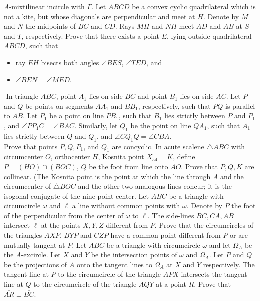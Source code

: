 \documentclass{seto}
\begin{document}
$A$-mixtilinear incircle with $\Gamma$.
 Let $ABCD$ be a convex cyclic quadrilateral which is not a kite, but whose diagonals are perpendicular and meet at $H$. Denote by $M$ and $N$ the midpoints of $\overline{BC}$ and $\overline{CD}$. Rays $MH$ and $NH$ meet $\overline{AD}$ and $\overline{AB}$ at $S$ and $T$, respectively. Prove that there exists a point $E$, lying outside quadrilateral $ABCD$, such that
\begin{itemize}
  \item ray $EH$ bisects both angles $\angle BES$, $\angle TED$, and
  \item $\angle BEN = \angle MED$.
\end{itemize}$ $\vspace{-.8cm}
\exercise[IMO 2019/2] In triangle $ABC$, point $A_1$ lies on side $BC$ and point $B_1$ lies on side $AC$. Let $P$ and $Q$ be points on segments $AA_1$ and $BB_1$, respectively, such that $PQ$ is parallel to $AB$. Let $P_1$ be a point on line $PB_1$, such that $B_1$ lies strictly between $P$ and $P_1$, and $\angle PP_1C=\angle BAC$. Similarly, let $Q_1$ be the point on line $QA_1$, such that $A_1$ lies strictly between $Q$ and $Q_1$, and $\angle CQ_1Q=\angle CBA$. \\[4pt]
Prove that points $P,Q,P_1$, and $Q_1$ are concyclic. 
\exercise[MOP HW \#21] In acute scalene $\triangle ABC$ with circumcenter $O$, orthocenter $H$, Kosnita point $X_{54}=K$, define $P=(HO)\cap(BOC)$, $Q$ be the foot from line onto $AO$. Prove that $P,Q,K$ are collinear. (The Kosnita point is the point at which the line through $A$ and the circumcenter of $\triangle BOC$ and the other two analogous lines concur; it is the isogonal conjugate of the nine-point center. 
\exercise[Shortlist 2012/G8]Let $ABC$ be a triangle with circumcircle $\omega$ and $\ell$ a line without common points with $\omega$. Denote by $P$ the foot of the perpendicular from the center of $\omega$ to $\ell$. The side-lines $BC,CA,AB$ intersect $\ell$ at the points $X,Y,Z$ different from $P$. Prove that the circumcircles of the triangles $AXP$, $BYP$ and $CZP$ have a common point different from $P$ or are mutually tangent at $P$.
\exercise[Shortlist 2021/G8]Let $ABC$ be a triangle with circumcircle $\omega$ and let $\Omega_A$ be the $A$-excircle. Let $X$ and $Y$ be the intersection points of $\omega$ and $\Omega_A$. Let $P$ and $Q$ be the projections of $A$ onto the tangent lines to $\Omega_A$ at $X$ and $Y$ respectively. The tangent line at $P$ to the circumcircle of the triangle $APX$ intersects the tangent line at $Q$ to the circumcircle of the triangle $AQY$ at a point $R$. Prove that $\overline{AR} \perp \overline{BC}$.
\end{document}
